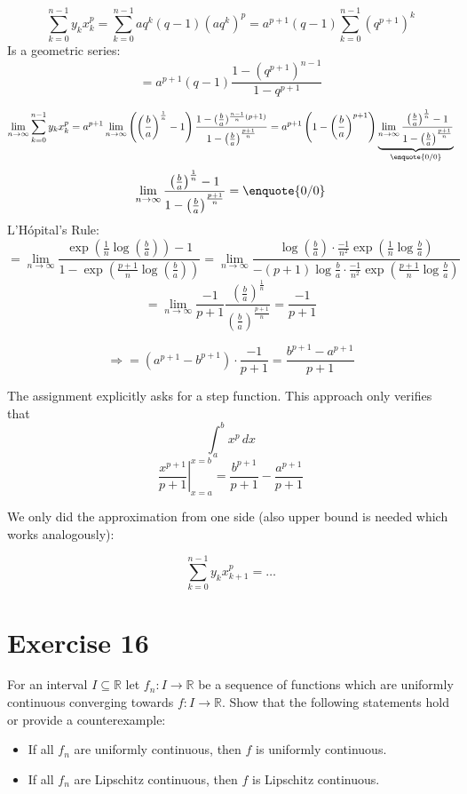 \documentclass[a4paper]{article}
\theoremstyle{definition}
\begin{document}
\[ \sum_{k=0}^{n-1} y_k x_k^p = \sum_{k=0}^{n-1} aq^k (q - 1) (aq^k)^p = a^{p+1} (q - 1) \sum_{k=0}^{n-1} (q^{p+1})^k \]
Is a geometric series:
\[ = a^{p+1} (q - 1) \frac{1 - (q^{p+1})^{n-1}}{1 - q^{p+1}} \]

\[
  \lim_{n\to\infty} \sum_{k=0}^{n-1} y_k x_k^p
    = a^{p+1} \lim_{n\to\infty} \left(\left(\frac ba\right)^{\frac1n} - 1\right)
    \frac{1 - (\frac ba)^{\frac{n-1}{n} (p+1)}}{1 - \left(\frac ba\right)^{\frac{p+1}{n}}}
    = a^{p+1} \left(1 - \left(\frac ba\right)^{p+1}\right) \underbrace{\lim_{n\to\infty} \frac{\left(\frac ba\right)^{\frac 1n} - 1}{1 - \left(\frac ba\right)^{\frac{p+1}{n}}}}_{\enquote{0/0}}
\] \[
  \lim_{n\to\infty} \frac{\left(\frac ba\right)^{\frac1n} - 1}{1 - \left(\frac ba\right)^{\frac{p+1}{n}}} = \enquote{0/0}
\]
L'H\'opital's Rule:
\[
  = \lim_{n\to\infty} \frac{\exp\left(\frac1n \log\left(\frac ba\right)\right) - 1}{1 - \exp\left(\frac{p+1}{n} \log\left(\frac ba\right)\right)}
  = \lim_{n\to\infty} \frac{\log\left(\frac ba\right) \cdot \frac{-1}{n^2} \exp\left(\frac1n \log\frac{b}{a}\right)}{-(p+1) \log\frac{b}{a} \cdot \frac{-1}{n^2} \exp\left(\frac{p+1}{n} \log\frac ba\right)}
\] \[
  = \lim_{n\to\infty} \frac{-1}{p+1} \frac{\left(\frac ba\right)^\frac 1n}{\left(\frac ba\right)^{\frac{p+1}{n}}}
  = \frac{-1}{p+1}
\]

\[ \Rightarrow = (a^{p+1} - b^{p+1}) \cdot \frac{-1}{p+1} = \frac{b^{p+1} - a^{p+1}}{p+1} \]

The assignment explicitly asks for a step function. This approach only verifies that
\[ \int_a^b x^p \, dx \]
\[ \left.\frac{x^{p+1}}{p+1}\right|_{x=a}^{x=b} = \frac{b^{p+1}}{p+1} - \frac{a^{p+1}}{p+1} \]

We only did the approximation from one side (also upper bound is needed which works analogously):

\[ \sum_{k=0}^{n-1} y_k x_{k+1}^p = \ldots \]

\section{Exercise 16}
\begin{ex}
  For an interval $I \subseteq \mathbb R$ let $f_n: I \to \mathbb R$ be a sequence of functions
  which are uniformly continuous converging towards $f: I \to \mathbb R$. Show that the following
  statements hold or provide a counterexample:
  \begin{itemize}
    \item If all $f_n$ are uniformly continuous, then $f$ is uniformly continuous.
    \item If all $f_n$ are Lipschitz continuous, then $f$ is Lipschitz continuous.
  \end{itemize}
\end{ex}
\end{document}
